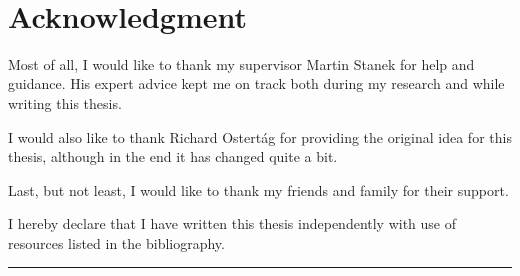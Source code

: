 ~\vspace{3cm}
\section*{Acknowledgment}

Most of all, I would like to thank my supervisor Martin Stanek for help and guidance.
His expert advice kept me on track both during my research and while writing this thesis.

I would also like to thank Richard Ostert\'ag for providing the original idea for this thesis, although in the end it has changed quite a bit.

Last, but not least, I would like to thank my friends and family for their support.

\vfill

\noindent I hereby declare that I have written this thesis independently with use of resources listed in the bibliography. 

\vspace{1cm}

\hfill
\begin{minipage}{6cm}
\hrule\medskip \centering \small \textit{\settingsAuthor}
\end{minipage}

\vspace{3cm}